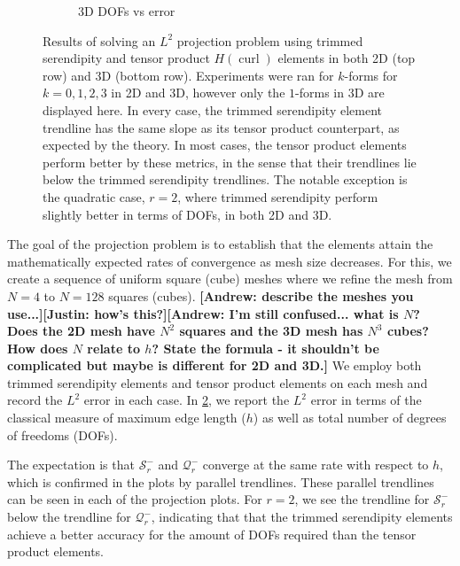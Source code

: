 \documentclass[format=acmsmall,screen,timestamp=false,a4paper]{acmart}
\DeclareMathOperator{\curl}{curl}
\newcommand\akg[1]{\textbf{\textcolor[rgb]{.5,0,1}{[Andrew: #1]}}}
\newcommand\justin[1]{\textbf{\textcolor[rgb]{0,1,0.5}{[Justin: #1]}}}
\newcommand{\hcurl}{\ensuremath{{H}(\curl)}\xspace}
\begin{document}
\begin{figure}[htbp]
\begin{subfigure}[h]{0.48\textwidth}
    \caption{3D DOFs vs error\label{fig:3dProjectionDofs}}
  \end{subfigure}
  \caption{Results of solving an $L^2$ projection problem using trimmed serendipity and tensor product \hcurl elements in both 2D (top row) and 3D (bottom row).  Experiments were ran for $k$-forms for $k=0,1,2,3$ in 2D and 3D, however only the $1$-forms in 3D are displayed here.  In every case, the trimmed serendipity element trendline has the same slope as its tensor product counterpart, as expected by the theory.  In most cases, the tensor product elements perform better by these metrics, in the sense that their trendlines lie below the trimmed serendipity trendlines.  The notable exception is the quadratic case, $r=2$, where trimmed serendipity perform slightly better in terms of DOFs, in both 2D and 3D.\label{Projections}} 
\end{figure}

The goal of the projection problem is to establish that the elements attain the mathematically expected rates of convergence as mesh size decreases.  For this, we create a sequence of uniform square (cube) meshes where we refine the mesh from $N=4$ to $N=128$ squares (cubes). \akg{describe the meshes you use...}\justin{how's this?}\akg{I'm still confused... what is $N$?  Does the 2D mesh have $N^2$ squares and the 3D mesh has $N^3$ cubes?  How does $N$ relate to $h$?  State the formula - it shouldn't be complicated but maybe is different for 2D and 3D.}
We employ both trimmed serendipity elements and tensor product elements on each mesh and record the $L^2$ error in each case.  In \cref{Projections}, we report the $L^2$ error in terms of the classical measure of maximum edge length ($h$) as well as total number of degrees of freedoms (DOFs).

The expectation is that $\mathcal{S}^-_r$ and $\mathcal{Q}^-_r$ converge at the same rate with respect to $h$, which is confirmed in the plots by parallel trendlines.  These parallel trendlines can be seen in each of the projection plots.  For $r=2$, we see the trendline for $\mathcal{S}^-_r$ below the trendline for $\mathcal{Q}^-_r$, indicating that that the trimmed serendipity elements achieve a better accuracy for the amount of DOFs required than the tensor product elements.  
\end{document}
